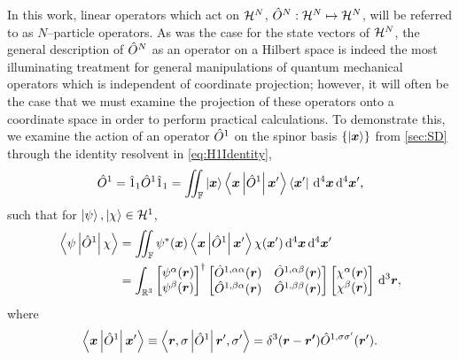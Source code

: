 In this work, linear operators which act on $\mathcal{H}^N$, $\hat{O}^N : \mathcal{H}^N \mapsto \mathcal{H}^N$, will be referred to as 
$N$--particle operators. As was the case for the state vectors of $\mathcal{H}^N$, the general description of $\hat{O}^N$
as an operator on a Hilbert space is indeed the most illuminating treatment for general manipulations of quantum mechanical
operators which is independent of coordinate projection; however, it will often be the case that we must examine the
projection of these operators onto a coordinate space in order to perform practical calculations. To demonstrate this, we examine
the action of an operator $\hat{O}^1$ on the spinor basis $\left \lbrace \left\vert \boldsymbol{x} \right\rangle \right\rbrace$ from \cref{sec:SD} through the identity resolvent in
\cref{eq:H1Identity},
\begin{align}
  \hat{O}^1 = \hat{1}_1 \hat{O}^1 \hat{1}_1 = \int\mkern-12mu\int_{\mathbb F} 
    \left\vert \boldsymbol{x} \right\rangle \left\langle \boldsymbol{x} \left\vert \hat{O}^1 \right\vert \boldsymbol{x}' \right\rangle\left\langle \boldsymbol{x}' \right\vert \,\mathrm{d}^4\boldsymbol{x} \,\mathrm{d}^4\boldsymbol{x}',
\end{align}
such that for $\left\vert \psi \right\rangle,\left\vert \chi \right\rangle \in \mathcal{H}^1$,
\begin{align}
  \label{eq:SpinorOpInner1}
  \left\langle \psi \left\vert \hat{O}^1 \right\vert \chi \right\rangle &= \int\mkern-12mu\int_{\mathbb F}
    \psi^*(\boldsymbol{x}) \left\langle \boldsymbol{x} \left\vert \hat{O}^1 \right\vert \boldsymbol{x}' \right\rangle \chi({\boldsymbol{x}'}) \,\mathrm{d}^4\boldsymbol{x} \,\mathrm{d}^4\boldsymbol{x}' \nonumber \\
  &= \int_{\mathbb R^3} 
    \begin{bmatrix}
      \psi^\alpha(\boldsymbol{r}) \\
      \psi^\beta(\boldsymbol{r})
    \end{bmatrix}^\dagger
    \begin{bmatrix}
      \hat{O}^{1,\alpha\alpha}({\boldsymbol{r}}) & \hat{O}^{1,\alpha\beta}({\boldsymbol{r}}) \\
      \hat{O}^{1,\beta\alpha} ({\boldsymbol{r}}) & \hat{O}^{1,\beta\beta} ({\boldsymbol{r}})
    \end{bmatrix}
    \begin{bmatrix}
      \chi^\alpha(\boldsymbol{r}) \\
      \chi^\beta(\boldsymbol{r})
    \end{bmatrix} \,\mathrm{d}^3\boldsymbol{r},
\end{align}
where 
\begin{equation}
  \label{eq:LocalSpinorOp1}
\left\langle \boldsymbol{x} \left\vert \hat{O}^1 \right\vert \boldsymbol{x}' \right\rangle  \equiv \left\langle \boldsymbol{r},\sigma \left\vert \hat{O}^1 \right\vert \boldsymbol{r}',\sigma' \right\rangle = \delta^3(\boldsymbol{r} - \boldsymbol{r'}) \hat{O}^{1,\sigma\sigma'}(\boldsymbol{r}').
\end{equation}
